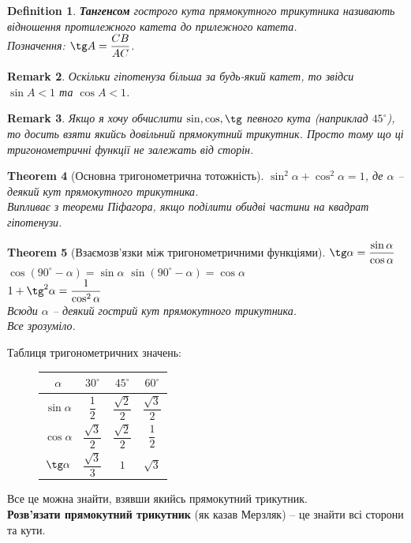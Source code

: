 \documentclass[a4paper, 10pt]{article}
\theoremstyle{theoremdd}
\newtheorem{theorem}{Theorem}[subsection]
\theoremstyle{theoremdd}
\theoremstyle{theoremdd}
\newtheorem{definition}[theorem]{Definition}
\theoremstyle{theoremdd}
\theoremstyle{theoremdd}
\theoremstyle{theoremdd}
\theoremstyle{theoremdd}
\newtheorem{remark}[theorem]{Remark}
\theoremstyle{theoremdd}
\theoremstyle{theoremdd}
\begin{document}
\begin{definition}
\textbf{Тангенсом} гострого кута прямокутного трикутника називають відношення протилежного катета до прилежного катета.\\
Позначення: $\tg A = \dfrac{CB}{AC}$.
\end{definition}

\begin{remark}
Оскільки гіпотенуза більша за будь-який катет, то звідси $\sin A < 1$ та $\cos A < 1$.
\end{remark}

\begin{remark}
Якщо я хочу обчислити $\sin, \cos, \tg$ певного кута (наприклад $45^\circ$), то досить взяти якийсь довільний прямокутний трикутник. Просто тому що ці тригонометричні функції не залежать від сторін.
\end{remark}

\begin{theorem}[Основна тригонометрична тотожність]
$\sin^2 \alpha + \cos^2 \alpha = 1$, де $\alpha$ -- деякий кут прямокутного трикутника.\\
\textit{Випливає з теореми Піфагора, якщо поділити обидві частини на квадрат гіпотенузи.}
\end{theorem}

\begin{theorem}[Взаємозв'язки між тригонометричними функціями]
$\tg \alpha = \dfrac{\sin \alpha}{\cos \alpha}$\\
$\cos (90^\circ - \alpha) = \sin \alpha$ \hspace{1cm} $\sin (90^\circ - \alpha) = \cos \alpha$\\
$1 + \tg^2 \alpha = \dfrac{1}{\cos^2 \alpha}$\\
Всюди $\alpha$ -- деякий гострий кут прямокутного трикутника.\\
\textit{Все зрозуміло.}
\end{theorem}

Таблиця тригонометричних значень:
\begin{figure}[H]
\centering
\begin{tabular}{c|c|c|c}
$\alpha$ & $30^\circ$ & $45^{\circ}$ & $60^\circ$ \\ \hline
$\sin \alpha$ & $\dfrac{1}{2}$ & $\dfrac{\sqrt{2}}{2}$ & $\dfrac{\sqrt{3}}{2}$ \\
$\cos \alpha$ & $\dfrac{\sqrt{3}}{2}$ & $\dfrac{\sqrt{2}}{2}$ & $\dfrac{1}{2}$ \\
$\tg \alpha$ & $\dfrac{\sqrt{3}}{3}$ & $1$ & $\sqrt{3}$ \\
\end{tabular}
\end{figure}
Все це можна знайти, взявши якийсь прямокутний трикутник.
\bigskip \\
\textbf{Розв'язати прямокутний трикутник} (як казав Мерзляк) -- це знайти всі сторони та кути.
\end{document}
